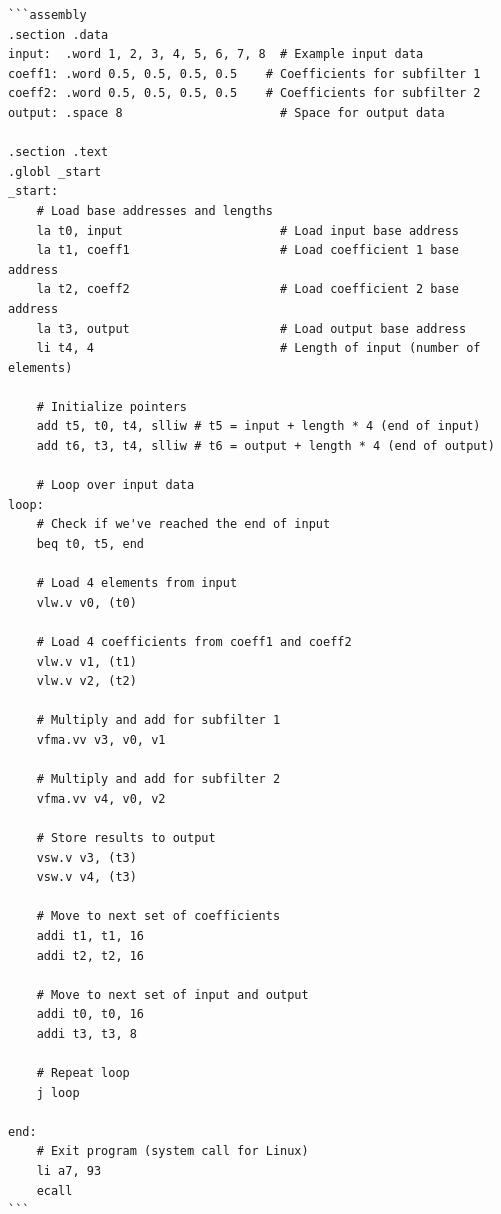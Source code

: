 \documentclass[a4wide,twocolumn]{article}
\begin{document}
\begin{scriptsize}
\begin{lstlisting}
```assembly
.section .data
input:  .word 1, 2, 3, 4, 5, 6, 7, 8  # Example input data
coeff1: .word 0.5, 0.5, 0.5, 0.5    # Coefficients for subfilter 1
coeff2: .word 0.5, 0.5, 0.5, 0.5    # Coefficients for subfilter 2
output: .space 8                      # Space for output data

.section .text
.globl _start
_start:
    # Load base addresses and lengths
    la t0, input                      # Load input base address
    la t1, coeff1                     # Load coefficient 1 base address
    la t2, coeff2                     # Load coefficient 2 base address
    la t3, output                     # Load output base address
    li t4, 4                          # Length of input (number of elements)

    # Initialize pointers
    add t5, t0, t4, slliw # t5 = input + length * 4 (end of input)
    add t6, t3, t4, slliw # t6 = output + length * 4 (end of output)

    # Loop over input data
loop:
    # Check if we've reached the end of input
    beq t0, t5, end

    # Load 4 elements from input
    vlw.v v0, (t0)

    # Load 4 coefficients from coeff1 and coeff2
    vlw.v v1, (t1)
    vlw.v v2, (t2)

    # Multiply and add for subfilter 1
    vfma.vv v3, v0, v1

    # Multiply and add for subfilter 2
    vfma.vv v4, v0, v2

    # Store results to output
    vsw.v v3, (t3)
    vsw.v v4, (t3)

    # Move to next set of coefficients
    addi t1, t1, 16
    addi t2, t2, 16

    # Move to next set of input and output
    addi t0, t0, 16
    addi t3, t3, 8

    # Repeat loop
    j loop

end:
    # Exit program (system call for Linux)
    li a7, 93
    ecall
```
\end{lstlisting}
\end{scriptsize}
\end{document}
